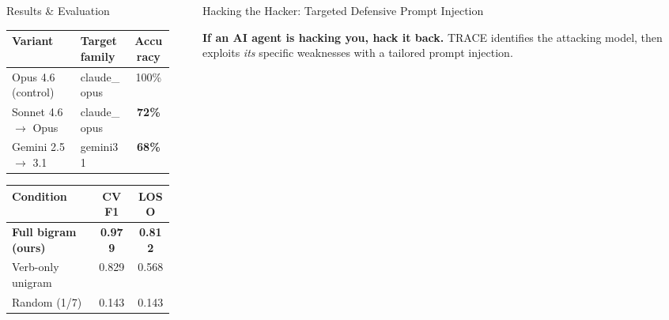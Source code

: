 \documentclass[final]{beamer}
\newlength{\sepwidth}
\newlength{\colwidth}
\newcommand{\separatorcolumn}{\begin{column}{\sepwidth}\end{column}}
\begin{document}
\begin{frame}[t]
\begin{columns}[t]
\begin{column}{\colwidth}
\begin{block}{Results \& Evaluation}

    \begin{table}
      \centering
      \begin{tabular}{l l c}
        \toprule
        \textbf{Variant} & \textbf{Target family} & \textbf{Accuracy} \\
        \midrule
        Opus 4.6 (control) & claude\_opus & \cellcolor{wingreen}100\% \\
        Sonnet 4.6 $\rightarrow$ Opus & claude\_opus & \cellcolor{lightblue}\textbf{72\%} \\
        Gemini 2.5 $\rightarrow$ 3.1 & gemini31 & \cellcolor{lightblue}\textbf{68\%} \\
        \bottomrule
      \end{tabular}
    \end{table}


    \begin{table}
      \centering
      \begin{tabular}{l c c}
        \toprule
        \textbf{Condition} & \textbf{CV F1} & \textbf{LOSO} \\
        \midrule
        \textbf{Full bigram (ours)} & \textbf{0.979} & \textbf{0.812} \\
        Verb-only unigram & 0.829 & 0.568 \\
        \rowcolor{losered} Random (1/7) & 0.143 & 0.143 \\
        \bottomrule
      \end{tabular}
    \end{table}

  \end{block}

\end{column}

\separatorcolumn

\begin{column}{\colwidth}

  \begin{alertblock}{Hacking the Hacker: Targeted Defensive Prompt Injection}

    \textbf{If an AI agent is hacking you, hack it back.}
    TRACE identifies the attacking model, then exploits \emph{its}
    specific weaknesses with a tailored prompt injection.


\end{alertblock}
\end{column}
\end{columns}
\end{frame}
\end{document}
